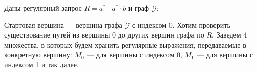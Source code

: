 \begin{example}
Даны регулярный запрос $R = a^* \mid a^* \cdot b$ и граф $\mathcal{G}$:
    
    \begin{center}
    \end{center}

Стартовая вершина --- вершина графа $\mathcal{G}$ с индексом 0. Хотим проверить существование путей из вершины 0 до других вершин графа по $R$. Заведем 4 множества, в которых будем хранить регулярные выражения, передаваемые в конкретную вершину: $M_{0}$ --- для вершины с индексом 0, $M_{1}$ --- для вершины с индексом 1 и так далее. 


\end{example}
